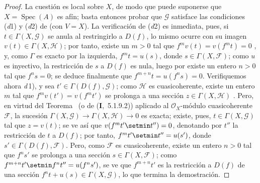 \begin{proof}
La cuestión es local sobre $X$, de modo que puede suponerse que $X=\operatorname{Spec}(A)$ es afín; basta entonces probar que $\mathcal G$ satisface las condiciones (\textit{d}1) y (\textit{d}2) de  (con $V=X$).
La verificación de (\textit{d}2) es inmediata, pues, si $t\in\Gamma(X,\mathcal G)$ se anula al restringirlo a $D(f)$, lo mismo ocurre con su imagen $v(t)\in\Gamma(X,\mathcal H)$; por tanto, existe un $m>0$ tal que $f^mv(t)=v(f^mt)=0$ , y, como $\Gamma$ es exacto por la izquierda, $f^mt=u(s)$, donde $s\in\Gamma(X,\mathcal F)$; como $u$ es inyectivo, la restricción de $s$ a $D(f)$ es nula, luego por  existe un entero $n>0$ tal que $f^ns=0$; se deduce finalmente que $f^{m+n}t=u(f^ns)=0$. Verifiquemos ahora \textit{d}\,1), y sea $t'\in\Gamma(D(f),\mathcal G)$; como $\mathcal H$ es cuasicoherente, existe un entero $m$ tal que $f^mv(t')=v(f^mt')$ se prolonga a una sección $z\in\Gamma(X,\mathcal H)$ .
Pero, en virtud del Teorema~ (o de (\textbf{I},~5.1.9.2)) aplicado al $\mathcal O_X$-módulo cuasicoherente $\mathcal F$, la sucesión $\Gamma(X,\mathcal G)\to\Gamma(X,\mathcal H)\to0$ es exacta; existe, pues, $t\in\Gamma(X,\mathcal G)$ tal que $z=v(t)$; se ve así que $v(f^mt'\setmin t'')=0$, denotando por $t''$ la restricción de $t$ a $D(f)$; por tanto, $f^mt'\setmin t''=u(s')$, donde $s'\in\Gamma(D(f),\mathcal F)$.
Pero, como $\mathcal F$ es cuasicoherente, existe un entero $n>0$ tal que $f^ns'$ se prolonga a una sección $s\in\Gamma(X,\mathcal F)$; como $f^{m+n}t'\setmin f^nt''=u(f^ns')$, se ve que $f^{m+n}t'$ es la restricción a $D(f)$ de una sección $f^nt+u(s)\in\Gamma(X,\mathcal G)$, lo que termina la demostración.
\end{proof}
